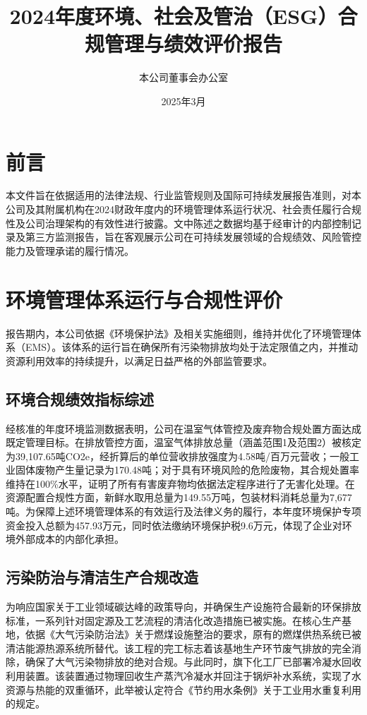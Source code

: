 \documentclass[a4paper,12pt]{article}
\title{\textbf{2024年度环境、社会及管治（ESG）合规管理与绩效评价报告}}
\author{本公司董事会办公室}
\date{2025年3月}
\begin{document}
\maketitle

\section*{前言}

本文件旨在依据适用的法律法规、行业监管规则及国际可持续发展报告准则，对本公司及其附属机构在2024财政年度内的环境管理体系运行状况、社会责任履行合规性及公司治理架构的有效性进行披露。文中陈述之数据均基于经审计的内部控制记录及第三方监测报告，旨在客观展示公司在可持续发展领域的合规绩效、风险管控能力及管理承诺的履行情况。

\section{环境管理体系运行与合规性评价}

报告期内，本公司依据《环境保护法》及相关实施细则，维持并优化了环境管理体系（EMS）。该体系的运行旨在确保所有污染物排放均处于法定限值之内，并推动资源利用效率的持续提升，以满足日益严格的外部监管要求。

\subsection{环境合规绩效指标综述}

经核准的年度环境监测数据表明，公司在温室气体管控及废弃物合规处置方面达成既定管理目标。在排放管控方面，温室气体排放总量（涵盖范围1及范围2）被核定为39,107.65吨CO2e，经折算后的单位营收排放强度为4.58吨/百万元营收；一般工业固体废物产生量记录为170.48吨；对于具有环境风险的危险废物，其合规处置率维持在100\%水平，证明了所有有害废弃物均依据法定程序进行了无害化处理。在资源配置合规性方面，新鲜水取用总量为149.55万吨，包装材料消耗总量为7,677吨。为保障上述环境管理体系的有效运行及法律义务的履行，本年度环境保护专项资金投入总额为457.93万元，同时依法缴纳环境保护税9.6万元，体现了企业对环境外部成本的内部化承担。

\subsection{污染防治与清洁生产合规改造}

为响应国家关于工业领域碳达峰的政策导向，并确保生产设施符合最新的环保排放标准，一系列针对固定源及工艺流程的清洁化改造措施已被实施。在核心生产基地，依据《大气污染防治法》关于燃煤设施整治的要求，原有的燃煤供热系统已被清洁能源热源系统所替代。该工程的完工标志着该基地生产环节废气排放的完全消除，确保了大气污染物排放的绝对合规。与此同时，旗下化工厂已部署冷凝水回收利用装置。该装置通过物理回收生产蒸汽冷凝水并回注于锅炉补水系统，实现了水资源与热能的双重循环，此举被认定符合《节约用水条例》关于工业用水重复利用的规定。
\end{document}
